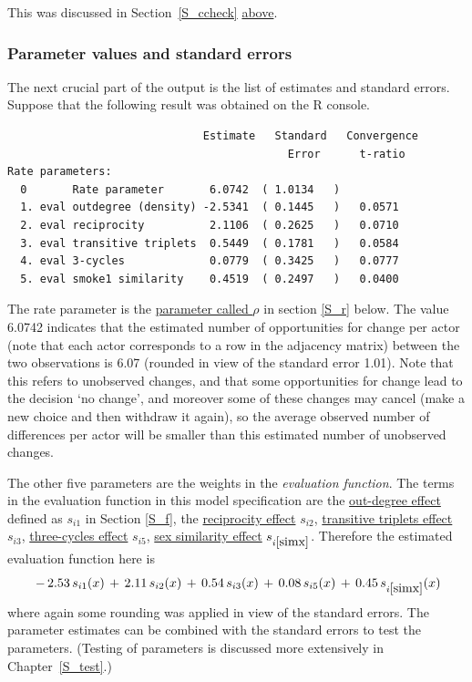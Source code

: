 \documentclass[a4paper,fleqn,11pt]{article}
\newcommand{\+}{\, + \,}
\renewcommand{\min}{\, - \,}
\newcommand{\R}{{\sf R }}
\begin{document}
This was discussed in Section~\ref{S_ccheck} \hyperlink{T_convergence}{above}.
\medskip

\subsubsection{Parameter values and standard errors}

The next crucial part of the output is the list of estimates and
standard errors. Suppose that the
following result was obtained on the \R console.

{\footnotesize
\begin{verbatim}
                              Estimate   Standard   Convergence
                                           Error      t-ratio
Rate parameters:
  0       Rate parameter       6.0742  ( 1.0134   )
  1. eval outdegree (density) -2.5341  ( 0.1445   )   0.0571
  2. eval reciprocity          2.1106  ( 0.2625   )   0.0710
  3. eval transitive triplets  0.5449  ( 0.1781   )   0.0584
  4. eval 3-cycles             0.0779  ( 0.3425   )   0.0777
  5. eval smoke1 similarity    0.4519  ( 0.2497   )   0.0400
\end{verbatim}
}

The rate parameter is the
\hyperlink{T_rho}{parameter called $\rho$}
in section \ref{S_r} below. The value 6.0742 indicates
that the estimated number of opportunities
for change per actor (note that each actor
corresponds to a row in the adjacency matrix)
between the two observations is
6.07 (rounded in view of the standard error 1.01). Note that this
refers to unobserved changes, and that some
opportunities for change lead to the decision `no change',
and moreover some of these changes may
cancel (make a new choice and then withdraw it again), so the
average observed number of differences per actor will be
smaller than this estimated number of unobserved changes.

The other five parameters are the weights in the \emph{evaluation function}.
The terms in the evaluation function in this model specification are
the \hyperlink{T_density}{out-degree effect} defined as $s_{i1}$ in
Section \ref{S_f}, the
\hyperlink{T_reci}{reciprocity effect} $s_{i2}$,
\hyperlink{T_transtrip}{transitive triplets effect} $s_{i3}$,
\hyperlink{T_cycle3}{three-cycles effect} $s_{i5}$,
\hyperlink{T_simx}{sex similarity effect} $s_{i\ref{simx}}$.
Therefore the
estimated evaluation function here is
\[
\min 2.53 \, s_{i1}(x) \+ 2.11\, s_{i2}(x) \+ 0.54 \, s_{i3}(x)\+ 0.08 \, s_{i5}(x)\+ 0.45 \, s_{i\ref{simx}}(x)
\]
where again some rounding was applied in view of the standard errors.
The parameter estimates can be combined with
the standard errors to test the parameters.
(Testing of parameters is discussed more extensively
in Chapter~\ref{S_test}.)
\end{document}
